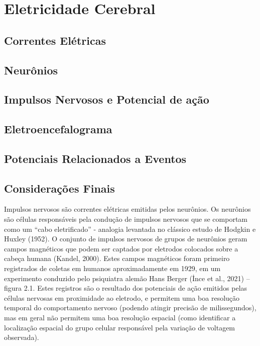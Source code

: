 \chapter{Eletricidade Cerebral}


\section{Correntes Elétricas}

\section{Neurônios}

\section{Impulsos Nervosos e Potencial de ação}


\section{Eletroencefalograma}


\section{Potenciais Relacionados a Eventos}


\section{Considerações Finais}

Impulsos nervosos são correntes elétricas emitidas pelos neurônios. Os neurônios são células responsáveis pela condução de impulsos nervosos que se comportam como um “cabo eletrificado” - 
analogia levantada no clássico estudo de Hodgkin e Huxley (1952). O conjunto de impulsos nervosos 
de grupos de neurônios geram campos magnéticos que 
podem ser captados por eletrodos colocados sobre a cabeça humana (Kandel, 2000). 
Estes campos magnéticos foram primeiro registrados de coletas em humanos aproximadamente em 1929,
 em um experimento conduzido pelo psiquiatra alemão Hans Berger (İnce et al., 2021) – figura 2.1. 
 Estes registros são o resultado dos potenciais de ação emitidos pelas células nervosas em proximidade ao eletrodo, e permitem uma boa resolução temporal do comportamento nervoso (podendo atingir precisão de milissegundos), mas em geral não permitem uma boa resolução espacial (como identificar a localização espacial do grupo celular responsável pela variação de voltagem observada). 



